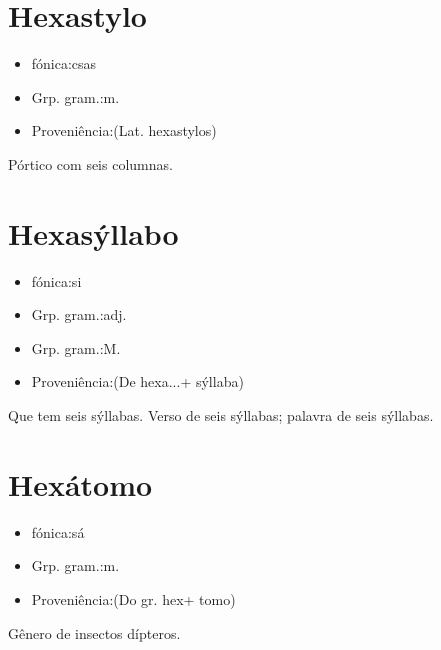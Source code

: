 \documentclass{article}
\begin{document}
\section{Hexastylo}
\begin{itemize}
\item {fónica:csas}
\end{itemize}
\begin{itemize}
\item {Grp. gram.:m.}
\end{itemize}
\begin{itemize}
\item {Proveniência:(Lat. \textunderscore hexastylos\textunderscore )}
\end{itemize}
Pórtico com seis columnas.
\section{Hexasýllabo}
\begin{itemize}
\item {fónica:si}
\end{itemize}
\begin{itemize}
\item {Grp. gram.:adj.}
\end{itemize}
\begin{itemize}
\item {Grp. gram.:M.}
\end{itemize}
\begin{itemize}
\item {Proveniência:(De \textunderscore hexa...\textunderscore  + \textunderscore sýllaba\textunderscore )}
\end{itemize}
Que tem seis sýllabas.
Verso de seis sýllabas; palavra de seis sýllabas.
\section{Hexátomo}
\begin{itemize}
\item {fónica:sá}
\end{itemize}
\begin{itemize}
\item {Grp. gram.:m.}
\end{itemize}
\begin{itemize}
\item {Proveniência:(Do gr. \textunderscore hex\textunderscore  + \textunderscore tomo\textunderscore )}
\end{itemize}
Gênero de insectos dípteros.
\end{document}
